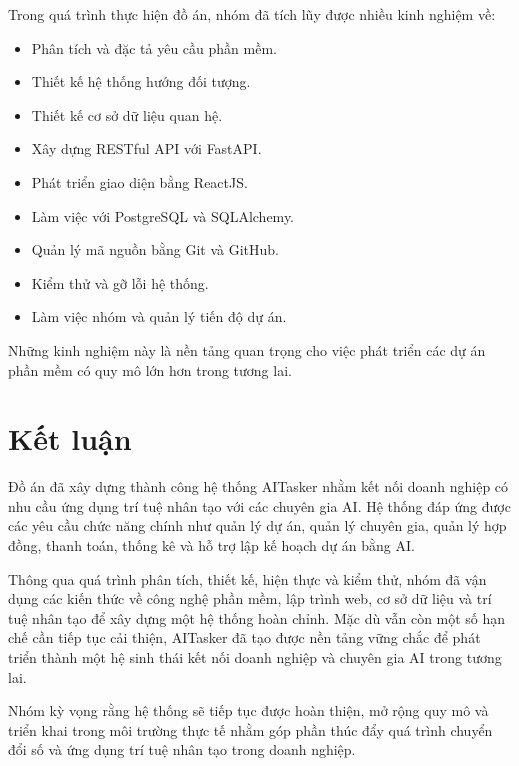 Trong quá trình thực hiện đồ án, nhóm đã tích lũy được nhiều kinh nghiệm về:

\begin{itemize}

\item Phân tích và đặc tả yêu cầu phần mềm.

\item Thiết kế hệ thống hướng đối tượng.

\item Thiết kế cơ sở dữ liệu quan hệ.

\item Xây dựng RESTful API với FastAPI.

\item Phát triển giao diện bằng ReactJS.

\item Làm việc với PostgreSQL và SQLAlchemy.

\item Quản lý mã nguồn bằng Git và GitHub.

\item Kiểm thử và gỡ lỗi hệ thống.

\item Làm việc nhóm và quản lý tiến độ dự án.

\end{itemize}

Những kinh nghiệm này là nền tảng quan trọng cho việc phát triển các dự án phần mềm có quy mô lớn hơn trong tương lai.

\section{Kết luận}

Đồ án đã xây dựng thành công hệ thống AITasker nhằm kết nối doanh nghiệp có nhu cầu ứng dụng trí tuệ nhân tạo với các chuyên gia AI. Hệ thống đáp ứng được các yêu cầu chức năng chính như quản lý dự án, quản lý chuyên gia, quản lý hợp đồng, thanh toán, thống kê và hỗ trợ lập kế hoạch dự án bằng AI.

Thông qua quá trình phân tích, thiết kế, hiện thực và kiểm thử, nhóm đã vận dụng các kiến thức về công nghệ phần mềm, lập trình web, cơ sở dữ liệu và trí tuệ nhân tạo để xây dựng một hệ thống hoàn chỉnh. Mặc dù vẫn còn một số hạn chế cần tiếp tục cải thiện, AITasker đã tạo được nền tảng vững chắc để phát triển thành một hệ sinh thái kết nối doanh nghiệp và chuyên gia AI trong tương lai.

Nhóm kỳ vọng rằng hệ thống sẽ tiếp tục được hoàn thiện, mở rộng quy mô và triển khai trong môi trường thực tế nhằm góp phần thúc đẩy quá trình chuyển đổi số và ứng dụng trí tuệ nhân tạo trong doanh nghiệp.